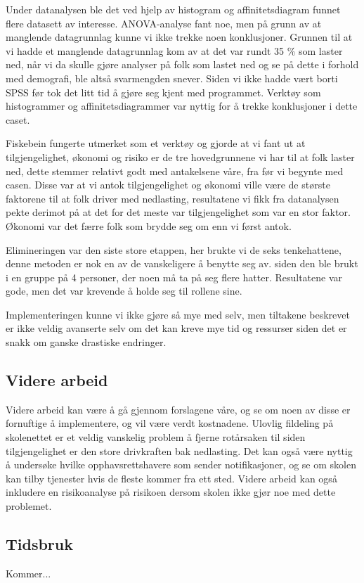 Under datanalysen ble det ved hjelp av histogram og affinitetsdiagram funnet flere datasett av interesse. ANOVA-analyse fant noe, men på grunn av at manglende datagrunnlag kunne vi ikke trekke noen konklusjoner. Grunnen til at vi hadde et manglende datagrunnlag kom av at det var rundt 35 \% som laster ned, når vi da skulle gjøre analyser på folk som lastet ned og se på dette i forhold med demografi, ble altså svarmengden snever. Siden vi ikke hadde vært borti SPSS før tok det litt tid å gjøre seg kjent med programmet. Verktøy som histogrammer og affinitetsdiagrammer var nyttig for å trekke konklusjoner i dette caset.

Fiskebein fungerte utmerket som et verktøy og gjorde at vi fant ut at tilgjengelighet, økonomi og risiko er de tre hovedgrunnene vi har til at folk laster ned, dette stemmer relativt godt med antakelsene våre, fra før vi begynte med casen. Disse var at vi antok tilgjengelighet og økonomi ville være de største faktorene til at folk driver med nedlasting, resultatene vi fikk fra datanalysen pekte derimot på at det for det meste var tilgjengelighet som var en stor faktor. Økonomi var det færre folk som brydde seg om enn vi først antok. 

Elimineringen var den siste store etappen, her brukte vi de seks tenkehattene, denne metoden er nok en av de vanskeligere å benytte seg av. siden den ble brukt i en gruppe på 4 personer, der noen må ta på seg flere hatter. Resultatene var gode, men det var krevende å holde seg til rollene sine. 

Implementeringen kunne vi ikke gjøre så mye med selv, men tiltakene beskrevet er ikke veldig avanserte selv om det kan kreve mye tid og ressurser siden det er snakk om ganske drastiske endringer. 

\subsection{Videre arbeid}
Videre arbeid kan være å gå gjennom forslagene våre, og se om noen av disse er fornuftige å implementere, og vil være verdt kostnadene. Ulovlig fildeling på skolenettet er et veldig vanskelig problem å fjerne rotårsaken til siden tilgjengelighet er den store drivkraften bak nedlasting. Det kan også være nyttig å undersøke hvilke opphavsrettshavere som sender notifikasjoner, og se om skolen kan tilby tjenester hvis de fleste kommer fra ett sted. Videre arbeid kan også inkludere en risikoanalyse på risikoen dersom skolen ikke gjør noe med dette problemet.

\subsection{Tidsbruk}
Kommer...

